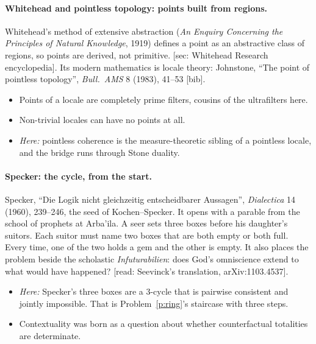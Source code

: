\documentclass[11pt]{article}
\theoremstyle{definition}
\theoremstyle{remark}
\begin{document}
\paragraph{Whitehead and pointless topology: points built from regions.}
Whitehead's method of extensive abstraction (\emph{An Enquiry Concerning the
Principles of Natural Knowledge}, 1919) defines a point as an abstractive class of
regions, so points are derived, not primitive. \textsf{[sec: Whitehead Research
encyclopedia]}. Its modern mathematics is locale theory: Johnstone, ``The point
of pointless topology'', \emph{Bull.\ AMS} 8 (1983), 41--53 \textsf{[bib]}.
\begin{itemize}[nosep]
  \item Points of a locale are completely prime filters, cousins of the
    ultrafilters here.
  \item Non-trivial locales can have no points at all.
  \item \emph{Here:} pointless coherence is the measure-theoretic sibling of a
    pointless locale, and the bridge runs through Stone duality.
\end{itemize}

\paragraph{Specker: the cycle, from the start.}
Specker, ``Die Logik nicht gleichzeitig entscheidbarer Aussagen'', \emph{Dialectica}
14 (1960), 239--246, the seed of Kochen--Specker. It opens with a parable from
the school of prophets at Arba'ila. A seer sets three boxes before his daughter's
suitors. Each suitor must name two boxes that are both empty or both full. Every
time, one of the two holds a gem and the other is empty. It also places the
problem beside the scholastic \emph{Infuturabilien}: does God's omniscience
extend to what would have happened? \textsf{[read: Seevinck's translation,
arXiv:1103.4537]}.
\begin{itemize}[nosep]
  \item \emph{Here:} Specker's three boxes are a 3-cycle that is pairwise
    consistent and jointly impossible. That is Problem~\ref{p:ring}'s staircase
    with three steps.
  \item Contextuality was born as a question about whether counterfactual
    totalities are determinate.
\end{itemize}
\end{document}

